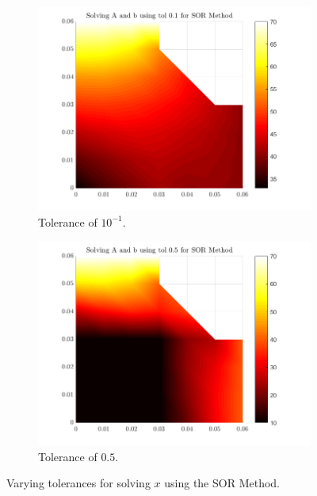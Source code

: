 \documentclass[12pt,a4paper]{article}
\begin{document}
\begin{figure}[H]
\begin{subfigure}[b]{0.48\textwidth}
		\includegraphics[width=\linewidth]{images/SORComparisontol0-1.png}
		\caption{Tolerance of $10^{-1}$.}
		\label{fig:SORtol0.1}
	\end{subfigure}
	\hfill
	\begin{subfigure}[b]{0.48\textwidth}
		\centering
		\includegraphics[width=\linewidth]{images/SORComparisontol0-5.png}
		\caption{Tolerance of $0.5$.}
		\label{fig:SORtol0.5}
	\end{subfigure}
	\caption{Varying tolerances for solving $x$ using the SOR Method.}
    \label{fig:SORtolerance}
\end{figure}
\end{document}
